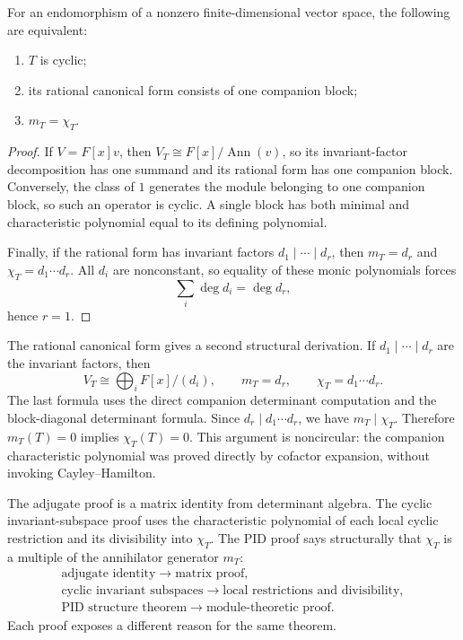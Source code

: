 \begin{corollary}
\label{cor:cyclic-operator-criterion}
For an endomorphism of a nonzero finite-dimensional vector space, the
following are equivalent:
\begin{enumerate}
\item \(T\) is cyclic;
\item its rational canonical form consists of one companion block;
\item \(m_T=\chi_T\).
\end{enumerate}
\end{corollary}
\begin{proof}
If \(V=F[x]v\), then
\(V_T\cong F[x]/\operatorname{Ann}(v)\), so its invariant-factor
decomposition has one summand and its rational form has one companion block.
Conversely, the class of \(1\) generates the module belonging to one
companion block, so such an operator is cyclic. A single block has both
minimal and characteristic polynomial equal to its defining polynomial.

Finally, if the rational form has invariant factors
\(d_1\mid\cdots\mid d_r\), then
\(m_T=d_r\) and \(\chi_T=d_1\cdots d_r\). All \(d_i\) are nonconstant, so
equality of these monic polynomials forces
\[
\sum_i\deg d_i=\deg d_r,
\]
hence \(r=1\).
\end{proof}

\begin{remark}
The rational canonical form gives a second structural derivation. If
\(d_1\mid\cdots\mid d_r\) are the invariant factors, then
\[
V_T\cong\bigoplus_iF[x]/(d_i),\qquad
m_T=d_r,\qquad
\chi_T=d_1\cdots d_r.
\]
The last formula uses the direct companion determinant computation and the
block-diagonal determinant formula. Since \(d_r\mid d_1\cdots d_r\), we have
\(m_T\mid\chi_T\). Therefore \(m_T(T)=0\) implies
\(\chi_T(T)=0\). This argument is noncircular: the companion characteristic
polynomial was proved directly by cofactor expansion, without invoking
Cayley--Hamilton.
\end{remark}

\begin{remark}
The adjugate proof is a matrix identity from determinant algebra. The cyclic
invariant-subspace proof uses the characteristic polynomial of each local
cyclic restriction and its divisibility into \(\chi_T\). The PID proof says structurally that
\(\chi_T\) is a multiple of the annihilator generator \(m_T\):
\[
\begin{array}{c}
\text{adjugate identity}\longrightarrow\text{matrix proof},\\
\text{cyclic invariant subspaces}\longrightarrow\text{local restrictions and divisibility},\\
\text{PID structure theorem}\longrightarrow\text{module-theoretic proof}.
\end{array}
\]
Each proof exposes a different reason for the same theorem.
\end{remark}

